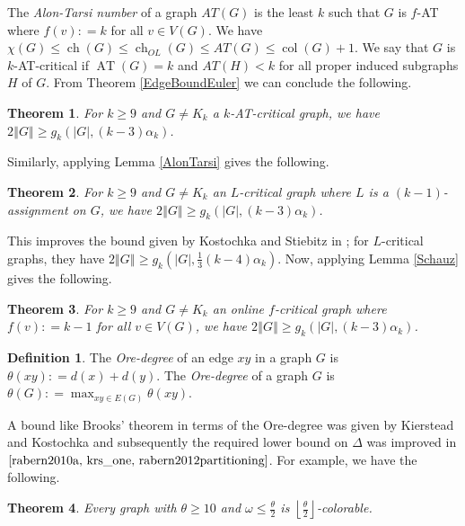 \documentclass[12pt]{article}
\theoremstyle{plain}
\newtheorem{thm}{Theorem}[section]
\theoremstyle{definition}
\newtheorem{defn}{Definition}
\theoremstyle{remark}
\newcommand{\card}[1]{\left|#1\right|}
\newcommand{\size}[1]{\left\Vert#1\right\Vert}
\newcommand{\floor}[1]{\left\lfloor#1\right\rfloor}
\newcommand{\DefinedAs}{\mathrel{\mathop:}=}
\newcommand{\AT}{\operatorname{AT}}
\newcommand{\col}{\operatorname{col}}
\newcommand{\ch}{\operatorname{ch}}
\begin{document}
The \emph{Alon-Tarsi number} of a graph $AT(G)$ is the least $k$ such that $G$ is $f$-AT where $f(v) \DefinedAs k$ for all $v \in V(G)$. We have $\chi(G) \leq \ch(G) \leq \ch_{OL}(G) \leq AT(G) \leq \col(G) + 1$.  We say that $G$ is $k$-AT-critical if $\AT(G) = k$ and $AT(H) < k$ for all proper induced subgraphs $H$ of $G$.  From Theorem \ref{EdgeBoundEuler} we can conclude the following.

\begin{thm}\label{EdgeBoundAT}
For $k \geq 9$ and $G \neq K_k$ a $k$-AT-critical graph, we have $2\size{G} \geq g_k(\card{G}, (k-3)\alpha_k)$.
\end{thm}

\noindent Similarly, applying Lemma \ref{AlonTarsi} gives the following.

\begin{thm}\label{EdgeBound}
For $k \geq 9$ and $G \neq K_k$ an $L$-critical graph where $L$ is a $(k-1)$-assignment on $G$, we have $2\size{G} \geq g_k(\card{G}, (k-3)\alpha_k)$.
\end{thm}

This improves the bound given by Kostochka and Stiebitz in \cite{kostochkastiebitzedgesincriticalgraph}; for $L$-critical graphs, they have $2\size{G} \geq g_k(\card{G}, \frac13 (k-4)\alpha_k)$.  Now, applying Lemma \ref{Schauz} gives the following.

\begin{thm}\label{EdgeBoundOnline}
For $k \geq 9$ and $G \neq K_k$ an online $f$-critical graph where $f(v) \DefinedAs k-1$ for all $v \in V(G)$, we have $2\size{G} \geq g_k(\card{G}, (k-3)\alpha_k)$.
\end{thm}

\begin{defn}
The \emph{Ore-degree} of an edge $xy$ in a graph $G$ is $\theta(xy) \DefinedAs d(x) + d(y)$.  The \emph{Ore-degree} of a graph $G$ is $\theta(G) \DefinedAs \max_{xy \in E(G)}\theta(xy)$.
\end{defn}

A bound like Brooks' theorem in terms of the Ore-degree was given by Kierstead and Kostochka \cite{kierstead2009ore} and subsequently the required lower bound on $\Delta$ was improved in $\cite{rabern2010a, krs_one, rabern2012partitioning}$.  For example, we have the following.

\begin{thm}\label{RegularOre}
Every graph with $\theta \geq 10$ and $\omega \leq \frac{\theta}{2}$ is $\floor{\frac{\theta}{2}}$-colorable.
\end{thm}
\end{document}
